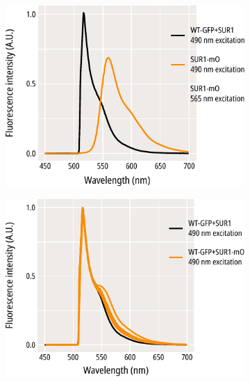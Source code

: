 \begin{figure}[h]
	\centering
	\begin{subfigure}[t]{0.3\textwidth}
		\caption{}\label{ch6fig:gfp_mo_spectra_1}
		\centering
		\includegraphics[width=\textwidth]{gfp_mo_spectra_1.pdf}
	\end{subfigure}
	\hfill
	\begin{subfigure}[t]{0.3\textwidth}
		\caption{}\label{ch6fig:wt_gfp_mo_spectra_1}
		\centering
		\includegraphics[width=\textwidth]{wt_gfp_mo_spectra_1.pdf}
	\end{subfigure}
	\hfill
	\begin{subfigure}[t]{0.3\textwidth}
		\caption{}\label{ch6fig:wt_gfp_mo_spectra_2}
		\centering

\end{subfigure}
\end{figure}
